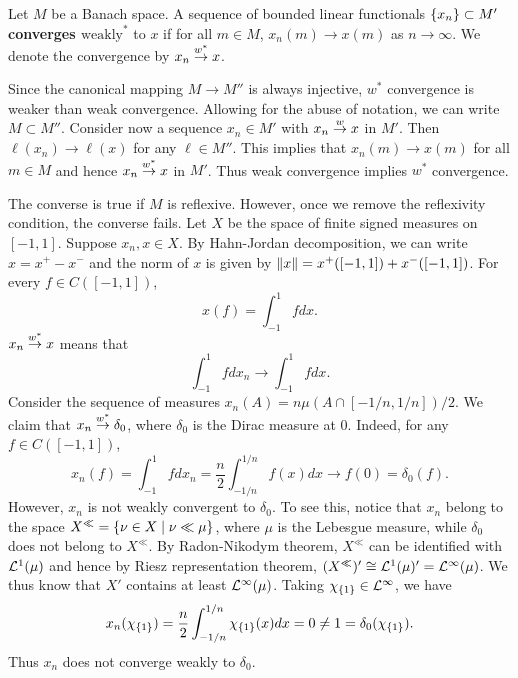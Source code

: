 \begin{definition}
    Let $M$ be a Banach space. A sequence of bounded linear functionals 
    $\left\{ {x_n} \right\}\subset M'$ \textbf{converges $\text{weakly}^*$} to $x$ if 
    for all $m\in M$, $x_n(m)\to x(m)$ as $n\to\infty$. We denote the 
    convergence by $x_n\overset{w^*}{\to} x$.
\end{definition}
\begin{remark}
    Since the canonical mapping $M\to M''$ is always injective, $w^*$ 
    convergence is weaker than weak convergence. Allowing for the abuse 
    of notation, we can write $M\subset M''$. Consider now a sequence 
    $x_n\in M'$ with $x_n\overset{w}{\to} x$ in $M'$. Then $\ell(x_n)\to\ell(x)$ for 
    any $\ell\in M''$. This implies that $x_n(m)\to x(m)$ for all $m\in M$ 
    and hence $x_n\overset{w^*}{\to} x$ in $M'$. Thus weak convergence implies $w^*$ 
    convergence. 

    The converse is true if $M$ is reflexive. However, once we remove the 
    reflexivity condition, the converse fails. Let $X$ be the space of finite 
    signed measures on $[-1,1]$. Suppose $x_n, x\in X$. By Hahn-Jordan decomposition, 
    we can write $x = x^+ - x^-$ and the norm of $x$ is given by 
    $\left\lVert {x} \right\rVert = x^+([-1,1]) + x^-([-1,1])$. For every $f\in C([-1,1])$, 
    \begin{equation*}
        x(f) = \int_{-1}^1 fdx.
    \end{equation*}
    $x_n\overset{w^*}{\to} x$ means that 
    \begin{equation*}
        \int_{-1}^1 fdx_n \to \int_{-1}^1 fdx.
    \end{equation*}
    Consider the sequence of measures $x_n(A) = n\mu(A\cap[-1/n,1/n])/2$. We claim 
    that $x_n\overset{w^*}{\to} \delta_0$, where $\delta_0$ is the Dirac measure at $0$. 
    Indeed, for any $f\in C([-1,1])$, 
    \begin{equation*}
        x_n(f) = \int_{-1}^1 fdx_n = \frac{n}{2}\int_{-1/n}^{1/n} f(x)dx \to f(0) = \delta_0(f).
    \end{equation*}
    However, $x_n$ is not weakly convergent to $\delta_0$. To see this, notice that 
    $x_n$ belong to the space $X^{\ll} = \left\{ \nu\in X \;\middle\vert\; \nu\ll\mu \right\}$, 
    where $\mu$ is the Lebesgue measure, while $\delta_0$ does not belong to $X^{\ll}$. 
    By Radon-Nikodym theorem, $X^{\ll}$ can be identified with $\mathcal{L}^1(\mu)$ and hence 
    by Riesz representation theorem, $(X^{\ll})' \cong \mathcal{L}^1(\mu)' = \mathcal{L}^\infty(\mu)$. 
    We thus know that $X'$ contains at least $\mathcal{L}^\infty(\mu)$. Taking $\chi_{\left\{ {1} \right\}}\in\mathcal{L}^\infty$, 
    we have 
    \begin{equation*}
        x_n(\chi_{\left\{ {1} \right\}}) = \frac{n}{2}\int_{-1/n}^{1/n} \chi_{\left\{ {1} \right\}}(x)dx = 0 \neq 1 = \delta_0(\chi_{\left\{ {1} \right\}}).
    \end{equation*}
    Thus $x_n$ does not converge weakly to $\delta_0$.
\end{remark}

